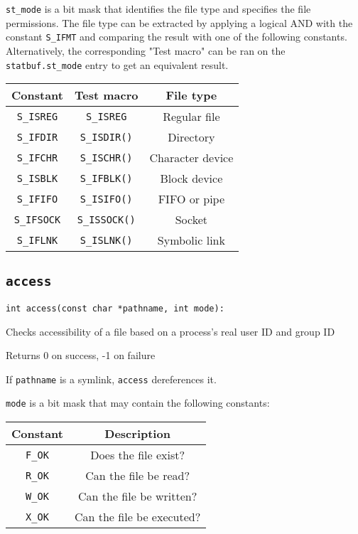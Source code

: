 \documentclass{article}
\begin{document}
\texttt{st\_mode} is a bit mask that identifies the file type and specifies the file permissions. The file type can be extracted by applying a logical AND with the constant \texttt{S\_IFMT} and comparing the result with one of the following constants. Alternatively, the corresponding "Test macro" can be ran on the \texttt{statbuf.st\_mode} entry to get an equivalent result.

\begin{center}
\begin{tabular}{ |c|c|c| }
    \hline \textbf{Constant} & \textbf{Test macro} & \textbf{File type} \\
    \hline
    \texttt{S\_ISREG} & \texttt{S\_ISREG} & Regular file \\
    \texttt{S\_IFDIR} & \texttt{S\_ISDIR()} & Directory \\
    \texttt{S\_IFCHR} & \texttt{S\_ISCHR()} & Character device \\
    \texttt{S\_ISBLK} & \texttt{S\_IFBLK()} & Block device \\
    \texttt{S\_IFIFO} & \texttt{S\_ISIFO()} & FIFO or pipe \\
    \texttt{S\_IFSOCK} & \texttt{S\_ISSOCK()} & Socket \\
    \texttt{S\_IFLNK} & \texttt{S\_ISLNK()} & Symbolic link \\
    \hline 
\end{tabular}
\end{center}

\subsection{\texttt{access}}

\begin{verbatim}
int access(const char *pathname, int mode):
\end{verbatim}

Checks accessibility of a file based on a process's real user ID and group ID

Returns 0 on success, -1 on failure

If \texttt{pathname} is a symlink, \texttt{access} dereferences it.

\texttt{mode} is a bit mask that may contain the following constants:

\begin{center}
\begin{tabular}{ |c|c| }
    \hline \textbf{Constant} & \textbf{Description} \\
    \hline
    \texttt{F\_OK} & Does the file exist? \\
    \texttt{R\_OK} & Can the file be read? \\
    \texttt{W\_OK} & Can the file be written? \\
    \texttt{X\_OK} & Can the file be executed? \\
    \hline \end{tabular}
\end{center}
\end{document}
